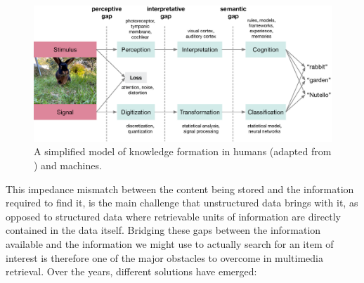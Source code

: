 \begin{figure}[tb]
    \centering
    \includegraphics[width=\textwidth]{figures/gaps.eps}
    \caption{A simplified model of knowledge formation in humans (adapted from \cite{Javanmardi:2021Exploring}) and machines.}
    \label{figure:knowledge_formation}
\end{figure}

This impedance mismatch between the content being stored and the information required to find it, is the main challenge that unstructured data brings with it, as opposed to structured data where retrievable units of information are directly contained in the data itself. Bridging these gaps between the information available and the information we might use to actually search for an item of interest is therefore one of the major obstacles to overcome in multimedia retrieval. Over the years, different solutions have emerged:

